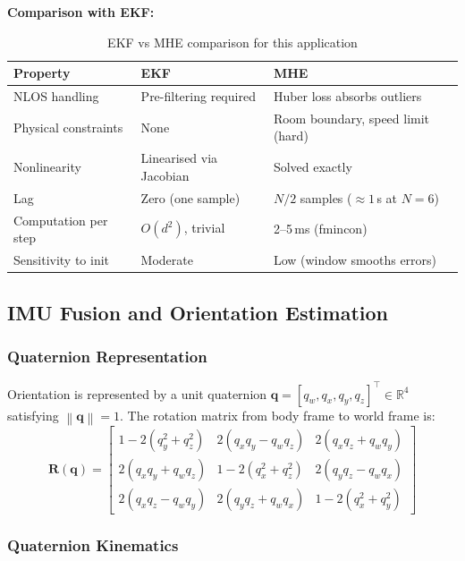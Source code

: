 \documentclass[11pt,a4paper]{article}
\newcommand{\vect}[1]{\bm{#1}}
\newcommand{\mat}[1]{\mathbf{#1}}
\newcommand{\norm}[1]{\left\|#1\right\|}
\newcommand{\Trans}{^{\top}}
\newcommand{\R}{\mathbb{R}}
\begin{document}
\textbf{Comparison with EKF:}
\begin{table}[h!]
\centering
\caption{EKF vs MHE comparison for this application}
\begin{tabular}{lll}
\toprule
\textbf{Property} & \textbf{EKF} & \textbf{MHE} \\
\midrule
NLOS handling & Pre-filtering required & Huber loss absorbs outliers \\
Physical constraints & None & Room boundary, speed limit (hard) \\
Nonlinearity & Linearised via Jacobian & Solved exactly \\
Lag & Zero (one sample) & $N/2$ samples ($\approx 1$\,s at $N=6$) \\
Computation per step & $O(d^2)$, trivial & 2--5\,ms (fmincon) \\
Sensitivity to init & Moderate & Low (window smooths errors) \\
\bottomrule
\end{tabular}
\end{table}

\subsection{IMU Fusion and Orientation Estimation}

\subsubsection{Quaternion Representation}

Orientation is represented by a unit quaternion $\vect{q} = [q_w, q_x, q_y, q_z]\Trans \in \R^4$ satisfying $\norm{\vect{q}} = 1$. The rotation matrix from body frame to world frame is:
\begin{equation}
\mat{R}(\vect{q}) = \begin{bmatrix}
1 - 2(q_y^2 + q_z^2) & 2(q_x q_y - q_w q_z) & 2(q_x q_z + q_w q_y) \\
2(q_x q_y + q_w q_z) & 1 - 2(q_x^2 + q_z^2) & 2(q_y q_z - q_w q_x) \\
2(q_x q_z - q_w q_y) & 2(q_y q_z + q_w q_x) & 1 - 2(q_x^2 + q_y^2)
\end{bmatrix}
\end{equation}

\subsubsection{Quaternion Kinematics}
\end{document}

